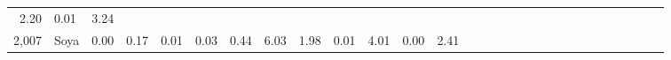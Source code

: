 \documentclass[]{article}
\begin{document}
\begin{longtable}[]{@{}rlrrrrrrrrrrrrrrrrrrrrrrrrrrr@{}}
\begin{minipage}[t]{0.01\columnwidth}
2.20\strut
\end{minipage} & \begin{minipage}[t]{0.01\columnwidth}\raggedleft\strut
0.01\strut
\end{minipage} & \begin{minipage}[t]{0.01\columnwidth}\raggedleft\strut
3.24\strut
\end{minipage}\tabularnewline
\begin{minipage}[t]{0.01\columnwidth}\raggedleft\strut
2,007\strut
\end{minipage} & \begin{minipage}[t]{0.02\columnwidth}\raggedright\strut
Soya\strut
\end{minipage} & \begin{minipage}[t]{0.01\columnwidth}\raggedleft\strut
0.00\strut
\end{minipage} & \begin{minipage}[t]{0.02\columnwidth}\raggedleft\strut
0.17\strut
\end{minipage} & \begin{minipage}[t]{0.02\columnwidth}\raggedleft\strut
0.01\strut
\end{minipage} & \begin{minipage}[t]{0.02\columnwidth}\raggedleft\strut
0.03\strut
\end{minipage} & \begin{minipage}[t]{0.01\columnwidth}\raggedleft\strut
0.44\strut
\end{minipage} & \begin{minipage}[t]{0.01\columnwidth}\raggedleft\strut
6.03\strut
\end{minipage} & \begin{minipage}[t]{0.01\columnwidth}\raggedleft\strut
1.98\strut
\end{minipage} & \begin{minipage}[t]{0.01\columnwidth}\raggedleft\strut
0.01\strut
\end{minipage} & \begin{minipage}[t]{0.01\columnwidth}\raggedleft\strut
4.01\strut
\end{minipage} & \begin{minipage}[t]{0.01\columnwidth}\raggedleft\strut
0.00\strut
\end{minipage} & \begin{minipage}[t]{0.02\columnwidth}\raggedleft\strut
2.41\strut
\end{minipage} & \begin{minipage}[t]{0.02\columnwidth}\raggedleft\strut

\end{minipage}
\end{longtable}
\end{document}

